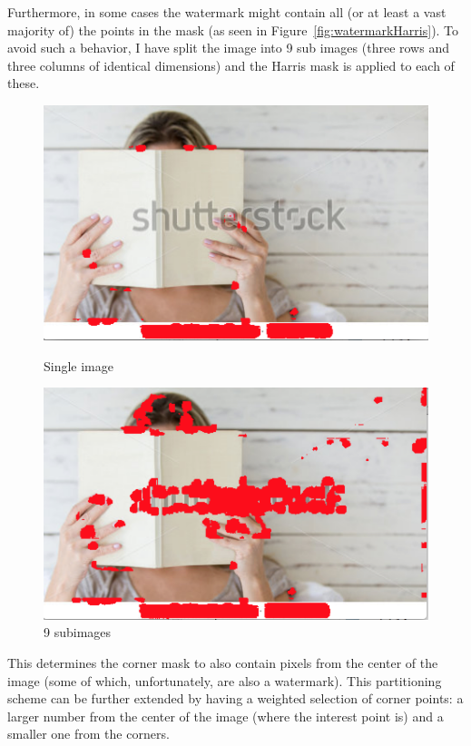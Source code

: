 Furthermore, in some cases the watermark might contain all (or at least a vast majority of) the points in the mask (as seen in Figure~\ref{fig:watermarkHarris}). To avoid such a behavior, I have split the image into 9 sub images (three rows and three columns of identical dimensions) and the Harris mask is applied to each of these.

\begin{figure}[ht!]
\centering
\begin{minipage}{.5\textwidth}
	\centering
	\includegraphics[width=.8\linewidth]{images/watermarkHarris.png}
	\caption{Single image}
	\label{fig:watermarkHarris}
\end{minipage}%
\begin{minipage}{.5\textwidth}
	\centering
	\includegraphics[width=.8\linewidth]{images/watermarkHarris9.png}
	\caption{9 subimages}
	\label{fig:watermarkHarris9}
\end{minipage}
\end{figure}

This determines the corner mask to also contain pixels from the center of the image (some of which, unfortunately, are also a watermark).
This partitioning scheme can be further extended by having a weighted selection of corner points: a larger number from the center of the image (where the interest point is) and a
smaller one from the corners.


